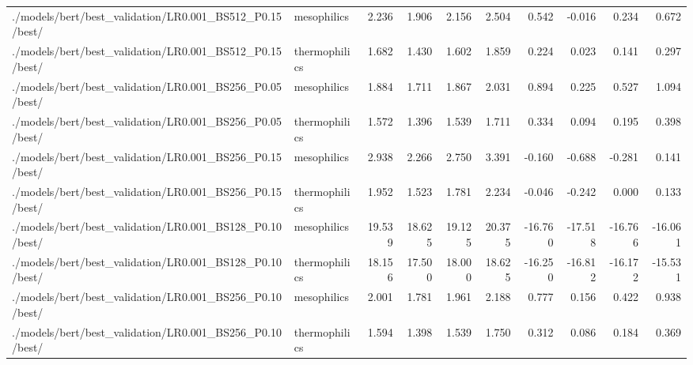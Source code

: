 \begin{tabular}{llrrrrrrrr}
	./models/bert/best_validation/LR0.001_BS512_P0.15/best/ & mesophilics &2.236 & 1.906 & 2.156 & 2.504 & 0.542 & -0.016 & 0.234 & 0.672\\
	./models/bert/best_validation/LR0.001_BS512_P0.15/best/ & thermophilics &1.682 & 1.430 & 1.602 & 1.859 & 0.224 & 0.023 & 0.141 & 0.297\\
	./models/bert/best_validation/LR0.001_BS256_P0.05/best/ & mesophilics &1.884 & 1.711 & 1.867 & 2.031 & 0.894 & 0.225 & 0.527 & 1.094\\
	./models/bert/best_validation/LR0.001_BS256_P0.05/best/ & thermophilics &1.572 & 1.396 & 1.539 & 1.711 & 0.334 & 0.094 & 0.195 & 0.398\\
	./models/bert/best_validation/LR0.001_BS256_P0.15/best/ & mesophilics &2.938 & 2.266 & 2.750 & 3.391 & -0.160 & -0.688 & -0.281 & 0.141\\
	./models/bert/best_validation/LR0.001_BS256_P0.15/best/ & thermophilics &1.952 & 1.523 & 1.781 & 2.234 & -0.046 & -0.242 & 0.000 & 0.133\\
	./models/bert/best_validation/LR0.001_BS128_P0.10/best/ & mesophilics &19.539 & 18.625 & 19.125 & 20.375 & -16.760 & -17.518 & -16.766 & -16.061\\
	./models/bert/best_validation/LR0.001_BS128_P0.10/best/ & thermophilics &18.156 & 17.500 & 18.000 & 18.625 & -16.250 & -16.812 & -16.172 & -15.531\\
	./models/bert/best_validation/LR0.001_BS256_P0.10/best/ & mesophilics &2.001 & 1.781 & 1.961 & 2.188 & 0.777 & 0.156 & 0.422 & 0.938\\
	./models/bert/best_validation/LR0.001_BS256_P0.10/best/ & thermophilics &1.594 & 1.398 & 1.539 & 1.750 & 0.312 & 0.086 & 0.184 & 0.369\\
	\bottomrule
\end{tabular}
